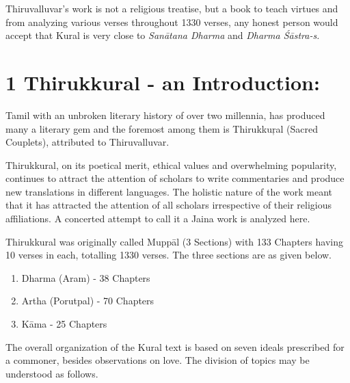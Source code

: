 Thiruvalluvar’s work is not a religious treatise, but a book to teach virtues and from analyzing various verses throughout 1330 verses, any honest person would accept that Kural is very close to \textit{Sanātana Dharma} and \textit{Dharma Śāstra-s.}


\section*{1 Thirukkural - an Introduction:}

Tamil with an unbroken literary history of over two millennia, has produced many a literary gem and the foremost among them is Thirukkuŗal (Sacred Couplets), attributed to Thiruvalluvar.

Thirukkural, on its poetical merit, ethical values and overwhelming popularity, continues to attract the attention of scholars to write commentaries and produce new translations in different languages. The holistic nature of the work meant that it has attracted the attention of all scholars irrespective of their religious affiliations. A concerted attempt to call it a Jaina work is analyzed here.

Thirukkural was originally called Muppāl (3 Sections) with 133 Chapters having 10 verses in each, totalling 1330 verses. The three sections are as given below.

\begin{enumerate}[{\rm 1)}]
\itemsep=0pt
\item Dharma (Aram) - 38 Chapters

 \item Artha (Porutpal) - 70 Chapters

 \item Kāma - 25 Chapters

\end{enumerate}

\newpage

The overall organization of the Kural text is based on seven ideals prescribed for a commoner, besides observations on love. The division of topics may be understood as follows.

